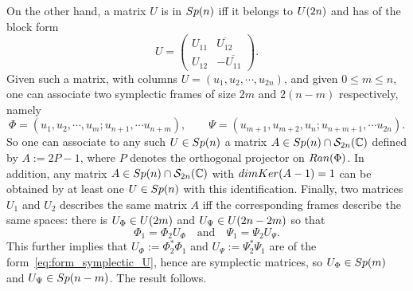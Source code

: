\documentclass[11pt]{amsart}
\numberwithin{equation}{section} %
\newcommand\1{{\mathds 1}}
\def\C{{\mathbb C}}
\def\cS{{\mathcal S}}
\def\U{{\rm U}}
\def\Sp{{\rm Sp}}
\def\Ker{{\rm Ker }}
\def\dim{{\rm dim }}
\begin{document}
On the other hand, a matrix $U$ is in $\Sp(n)$ iff it belongs to $\U(2n)$ and has of the block form
\begin{equation} \label{eq:form_symplectic_U}
    U = \begin{pmatrix}
        U_{11} & \overline{U_{12}}\\
        U_{12} & - \overline{U_{11}}
    \end{pmatrix}.
\end{equation}
Given such a matrix, with columns $U = (u_1, u_2, \cdots, u_{2n})$, and given $0 \le m \le n$, one can associate two symplectic frames of size $2m$ and $2(n-m)$ respectively, namely
\[
    \Phi = (u_1, u_2, \cdots, u_m ; u_{n+1}, \cdots u_{n+m}), \qquad 
    \Psi = (u_{m+1}, u_{m+2}, u_n ; u_{n+m+1}, \cdots u_{2n} ).
\]
So one can associate to any such $U \in \Sp(n)$ a matrix $A \in \Sp(n) \cap \cS_{2n}(\C)$ defined by $A := 2P - 1$, where $P$ denotes the orthogonal projector on ${\rm Ran}(\Phi)$. In addition, any matrix $A \in \Sp(n) \cap \cS_{2n}(\C)$ with $\dim \Ker(A - 1) = 1$ can be obtained by at least one $U \in \Sp(n)$ with this identification. Finally, two matrices $U_1$ and $U_2$ describes the same matrix $A$ iff the corresponding frames describe the same spaces: there is $U_\Phi \in \U(2 m)$ and $U_\Psi \in \U(2n-2m)$ so that
\[
    \Phi_1 = \Phi_2 U_\Phi \quad \text{and} \quad \Psi_1= \Psi_2 U_\Psi.
\]
This further implies that $U_\Phi := \Phi_2^* \Phi_1$ and $U_\Psi := \Psi_2^* \Psi_1$ are of the form~\eqref{eq:form_symplectic_U}, hence are symplectic matrices, so $U_\Phi \in \Sp(m)$ and $U_\Psi \in \Sp(n-m)$. The result follows.


%
%
\printbibliography
\end{document}
